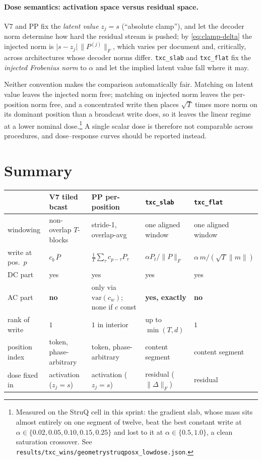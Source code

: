 \documentclass[11pt]{article}
\theoremstyle{definition}
\newcommand{\slab}{P}
\newcommand{\dc}{\overline{\slab}}
\begin{document}
\paragraph{Dose semantics: activation space versus residual space.}
V7 and PP fix the \emph{latent value} $z_j = s$ (``absolute clamp''), and let the decoder norm
determine how hard the residual stream is pushed; by \eqref{eq:clamp-delta} the injected norm is
$\lvert s - z_j\rvert\,\lVert\slab^{(j)}\rVert_F$, which varies per document and, critically,
across architectures whose decoder norms differ. \texttt{txc\_slab} and \texttt{txc\_flat} fix
the \emph{injected Frobenius norm} to $\alpha$ and let the implied latent value fall where it may.

Neither convention makes the comparison automatically fair. Matching on latent value leaves the
injected norm free; matching on injected norm leaves the per-position norm free, and a
concentrated write then places $\sqrt{T}$ times more norm on its dominant position than a
broadcast write does, so it leaves the linear regime at a lower nominal dose.\footnote{Measured
on the StruQ cell in this sprint: the gradient slab, whose mass sits almost entirely on one
segment of twelve, beat the best constant write at $\alpha\in\{0.02,0.05,0.10,0.15,0.25\}$ and
lost to it at $\alpha\in\{0.5,1.0\}$, a clean saturation crossover. See
\texttt{results/txc\_wins/geometrystruqposx\_lowdose.json}.} A single scalar dose is therefore
not comparable across procedures, and dose--response curves should be reported instead.

\section{Summary}

\begin{table}[h]
\centering
\small
\begin{tabular}{@{}lllll@{}}
\toprule
 & \textbf{V7 tiled bcast} & \textbf{PP per-position} & \textbf{\texttt{txc\_slab}} & \textbf{\texttt{txc\_flat}} \\
\midrule
windowing        & non-overlap $T$-blocks & stride-1, overlap-avg & one aligned window & one aligned window\\
write at pos.\ $p$ & $c_b\,\dc$            & $\frac1T\sum_\tau c_{p-\tau}\slab_\tau$ & $\alpha\slab_t/\lVert \slab\rVert_F$ & $\alpha\, m/(\sqrt T\lVert m\rVert)$\\
DC part          & yes                    & yes                   & yes                & yes \\
AC part          & \textbf{no}            & only via $\mathrm{var}(c_w)$; none if $c$ const & \textbf{yes, exactly} & \textbf{no}\\
rank of write    & $1$                    & $1$ in interior       & up to $\min(T,d)$  & $1$\\
position index   & token, phase-arbitrary & token, phase-arbitrary& content segment    & content segment\\
dose fixed in    & activation ($z_j=s$)   & activation ($z_j=s$)  & residual ($\lVert\Delta\rVert_F$) & residual\\
\bottomrule
\end{tabular}
\end{table}
\end{document}
